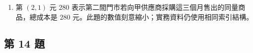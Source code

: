 \documentclass[11pt,a4paper]{article}
\begin{document}
\begin{enumerate}
  \[
  \begin{aligned}
  QP
  &=\begin{bmatrix}5&4&6\\5&4&5\end{bmatrix}
  \begin{bmatrix}30&32\\20&25\\10&12\end{bmatrix}\\
  &=\begin{bmatrix}
  5(30)+4(20)+6(10)&5(32)+4(25)+6(12)\\
  5(30)+4(20)+5(10)&5(32)+4(25)+5(12)
  \end{bmatrix}\\
  &=\begin{bmatrix}290&332\\280&320\end{bmatrix}
  \end{aligned}
  \]
\item
  第 \((2,1)\) 元 \(280\) 表示第二間門市若向甲供應商採購這三個月售出的同量商品，總成本是 \(280\) 元。此題的數值刻意縮小；實務資料仍使用相同索引結構。
\end{enumerate}

\subsection{第 14 題}\label{ux7b2c-14-ux984c}
\end{document}
